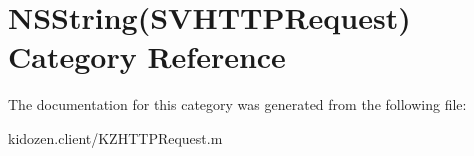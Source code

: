 \hypertarget{category_n_s_string_07_s_v_h_t_t_p_request_08}{\section{N\-S\-String(S\-V\-H\-T\-T\-P\-Request) Category Reference}
\label{category_n_s_string_07_s_v_h_t_t_p_request_08}
}


The documentation for this category was generated from the following file\-:\begin{DoxyCompactItemize}
\item 
kidozen.\-client/K\-Z\-H\-T\-T\-P\-Request.\-m\end{DoxyCompactItemize}
